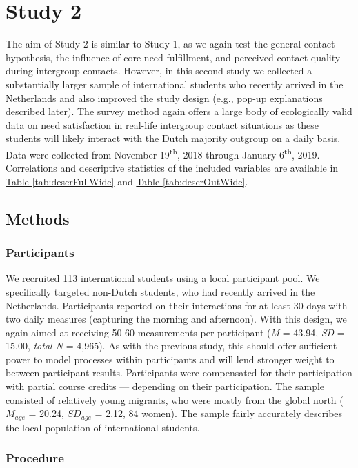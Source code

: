 \documentclass[man, 12pt, a4paper, mask]{apa7}
\theoremstyle{break}
\theoremstyle{plain}
\newcommand{\tblref}[2][]{\hyperref[#2]{Table \ref*{#2}#1}}
\begin{document}
\section{Study 2}

The aim of Study 2 is similar to Study 1, as we again test the general
contact hypothesis, the influence of core need fulfillment, and
perceived contact quality during intergroup contacts. However, in this
second study we collected a substantially larger sample of international
students who recently arrived in the Netherlands and also improved the
study design (e.g., pop-up explanations described later). The survey
method again offers a large body of ecologically valid data on need
satisfaction in real-life intergroup contact situations as these
students will likely interact with the Dutch majority outgroup on a
daily basis. Data were collected from November 19\textsuperscript{th},
2018 through January 6\textsuperscript{th}, 2019. Correlations and
descriptive statistics of the included variables are available in
\tblref{tab:descrFullWide} and \tblref{tab:descrOutWide}.

\subsection{Methods}

\subsubsection{Participants}

We recruited 113 international students using a local participant pool.
We specifically targeted non-Dutch students, who had recently arrived in
the Netherlands. Participants reported on their interactions for at
least 30 days with two daily measures (capturing the morning and
afternoon). With this design, we again aimed at receiving 50-60
measurements per participant (\textit{M} = 43.94, \textit{SD} = 15.00,
\textit{total N} = 4,965). As with the previous study, this should offer
sufficient power to model processes within participants and will lend
stronger weight to between-participant results. Participants were
compensated for their participation with partial course credits ---
depending on their participation. The sample consisted of relatively
young migrants, who were mostly from the global north (\(M_{age}\) =
20.24, \(SD_{age}\) = 2.12, 84 women). The sample fairly accurately
describes the local population of international students.

\subsubsection{Procedure}
\end{document}
